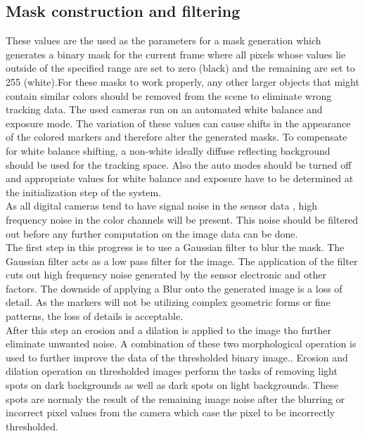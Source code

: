 \subsection{Mask construction and filtering}
These values are the used as the parameters for a mask generation which generates a binary mask for the current frame where all pixels whose values lie outside of the specified range are set to zero (black) and the remaining are set to 255 (white).For these masks to work properly, any other larger objects that might contain similar colors should be removed from the scene to eliminate wrong tracking data. The used cameras run on an automated white balance and exposure mode. The variation of these values can cause shifts in the appearance of the colored markers and therefore alter the generated masks. To compensate for white balance shifting, a non-white ideally diffuse reflecting background should be used for the tracking space. Also the auto modes should be turned off and appropriate values for white balance and exposure have to be determined at the initialization step of the system.\\As all digital cameras tend to have signal noise in the sensor data , high frequency  noise in the color channels will be present. This noise should be filtered out before any further computation on the image data can be done.\\
The first step in this progress is to use a Gaussian filter to blur the mask.
The Gaussian filter acts as a low pass filter for the image. The application of the filter cuts out high frequency noise generated by the sensor electronic and other factors. The downside of applying a Blur onto the generated image is a loss of detail. As the markers will not be utilizing complex geometric forms or fine patterns, the loss of details is acceptable.\\After this step an erosion and a dilation is applied to the image tho further eliminate unwanted noise. A combination of these two morphological operation  is used to further improve the data of the thresholded binary image\cite[chapter~3.11-12]{Davies.2017}..
Erosion and dilation operation on thresholded images perform the tasks of removing light spots on dark backgrounds as well as dark spots on light backgrounds. These spots are normaly the result of the remaining image noise after the blurring or incorrect pixel values from the camera which case the pixel to be incorrectly thresholded.




